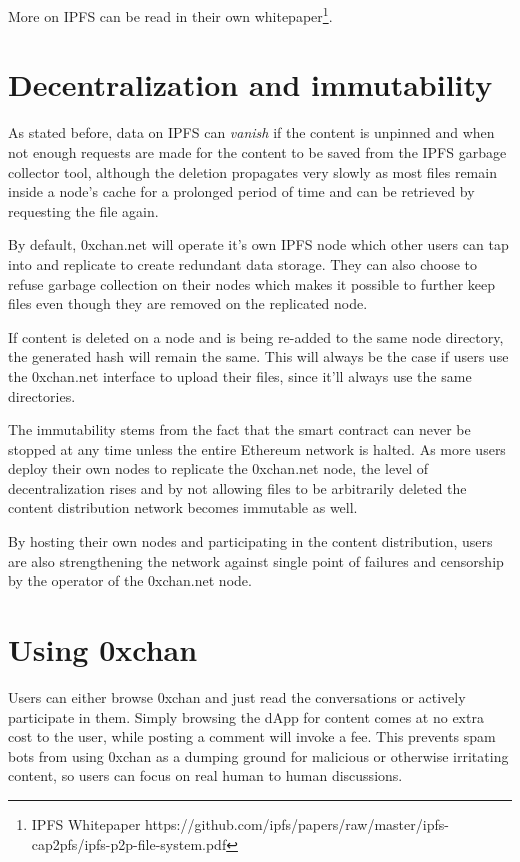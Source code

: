 \documentclass[a4paper]{article}
\newcommand{\projectname}{0xchan}
\begin{document}
More on IPFS can be read in their own whitepaper\footnote{IPFS Whitepaper https://github.com/ipfs/papers/raw/master/ipfs-cap2pfs/ipfs-p2p-file-system.pdf}.

\section{Decentralization and immutability}
As stated before, data on IPFS can \emph{vanish} if the content is unpinned and when not enough requests are made for the content to be saved from the IPFS garbage collector tool, although the deletion propagates very slowly as most files remain inside a node's cache for a prolonged period of time and can be retrieved by requesting the file again. 

By default, 0xchan.net will operate it's own IPFS node which other users can tap into and replicate to create redundant data storage. They can also choose to refuse garbage collection on their nodes which makes it possible to further keep files even though they are removed on the replicated node.

If content is deleted on a node and is being re-added to the same node directory, the generated hash will remain the same. This will always be the case if users use the 0xchan.net interface to upload their files, since it'll always use the same directories.

The immutability stems from the fact that the smart contract can never be stopped at any time unless the entire Ethereum network is halted. As more users deploy their own nodes to replicate the 0xchan.net node, the level of decentralization rises and by not allowing files to be arbitrarily deleted the content distribution network becomes immutable as well.

By hosting their own nodes and participating in the content distribution, users are also strengthening the network against single point of failures and censorship by the operator of the 0xchan.net node.

\section{Using \projectname}
Users can either browse \projectname{} and just read the conversations or actively participate in them. Simply browsing the dApp for content comes at no extra cost to the user, while posting a comment will invoke a fee. This prevents spam bots from using \projectname{} as a dumping ground for malicious or otherwise irritating content, so users can focus on real human to human discussions.
\end{document}
